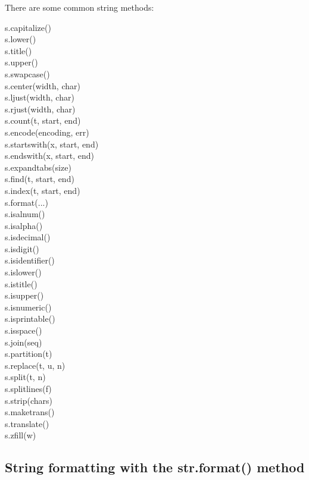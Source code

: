 There are some common string methods:
\begin{description}
\item[s.capitalize()] 
\item[s.lower()] 
\item[s.title()] 
\item[s.upper()] 
\item[s.swapcase()] 
\item[s.center(width, char)]
\item[s.ljust(width, char)] 
\item[s.rjust(width, char)] 
\item[s.count(t, start, end)] 
\item[s.encode(encoding, err)] 
\item[s.startswith(x, start, end)] 
\item[s.endswith(x, start, end)] 
\item[s.expandtabs(size)] 
\item[s.find(t, start, end)] 
\item[s.index(t, start, end)] 
\item[s.format(...)] 
\item[s.isalnum()] 
\item[s.isalpha()] 
\item[s.isdecimal()] 
\item[s.isdigit()] 
\item[s.isidentifier()] 
\item[s.islower()]
\item[s.istitle()] 
\item[s.isupper()] 
\item[s.isnumeric()] 
\item[s.isprintable()] 
\item[s.isspace()] 
\item[s.join(seq)] 
\item[s.partition(t)] 
\item[s.replace(t, u, n)] 
\item[s.split(t, n)] 
\item[s.splitlines(f)] 
\item[s.strip(chars)] 
\item[s.maketrans()] 
\item[s.translate()] 
\item[s.zfill(w)] 
\end{description}

\subsection{String formatting with the str.format() method}

